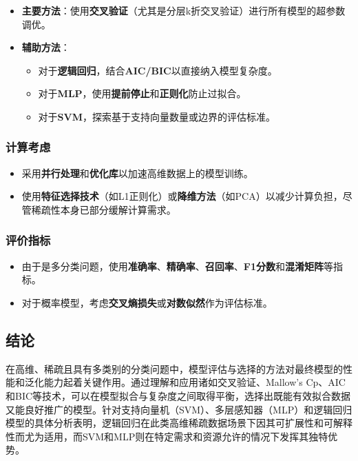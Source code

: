 \documentclass[11pt,a4paper]{article}
\begin{document}
\begin{itemize}
    \item \textbf{主要方法}：使用\textbf{交叉验证}（尤其是分层k折交叉验证）进行所有模型的超参数调优。
    \item \textbf{辅助方法}：
    \begin{itemize}
        \item 对于\textbf{逻辑回归}，结合\textbf{AIC/BIC}以直接纳入模型复杂度。
        \item 对于\textbf{MLP}，使用\textbf{提前停止}和\textbf{正则化}防止过拟合。
        \item 对于\textbf{SVM}，探索基于支持向量数量或边界的评估标准。
    \end{itemize}
\end{itemize}

\subsubsection{计算考虑}

\begin{itemize}
    \item 采用\textbf{并行处理}和\textbf{优化库}以加速高维数据上的模型训练。
    \item 使用\textbf{特征选择技术}（如L1正则化）或\textbf{降维方法}（如PCA）以减少计算负担，尽管稀疏性本身已部分缓解计算需求。
\end{itemize}

\subsubsection{评价指标}

\begin{itemize}
    \item 由于是多分类问题，使用\textbf{准确率}、\textbf{精确率}、\textbf{召回率}、\textbf{F1分数}和\textbf{混淆矩阵}等指标。
    \item 对于概率模型，考虑\textbf{交叉熵损失}或\textbf{对数似然}作为评估标准。
\end{itemize}

\subsection{结论}

在高维、稀疏且具有多类别的分类问题中，模型评估与选择的方法对最终模型的性能和泛化能力起着关键作用。通过理解和应用诸如交叉验证、Mallow’s Cp、AIC和BIC等技术，可以在模型拟合与复杂度之间取得平衡，选择出既能有效拟合数据又能良好推广的模型。针对支持向量机（SVM）、多层感知器（MLP）和逻辑回归模型的具体分析表明，逻辑回归在此类高维稀疏数据场景下因其可扩展性和可解释性而尤为适用，而SVM和MLP则在特定需求和资源允许的情况下发挥其独特优势。
\end{document}

